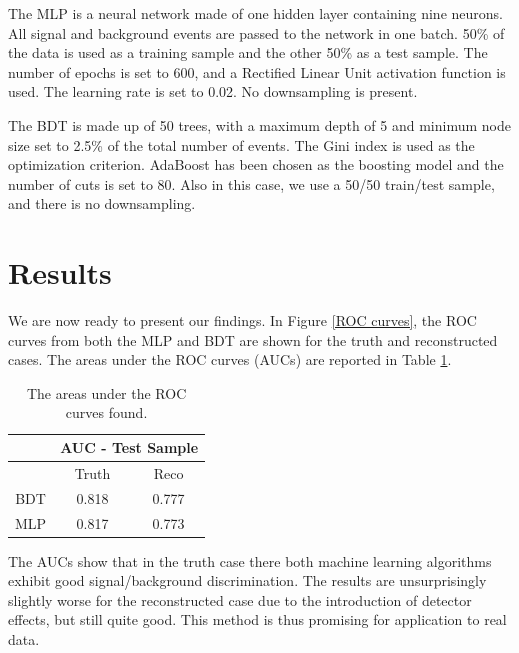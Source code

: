 \documentclass[10pt,a4paper]{book}
\begin{document}
The MLP is a neural network made of one hidden layer containing nine neurons. All signal and background events are passed to the network in one batch. 50\% of the data is used as a training sample and the other 50\% as a test sample. The number of epochs is set to 600, and a Rectified Linear Unit activation function is used. The learning rate is set to 0.02. No downsampling is present.

The BDT is made up of 50 trees, with a maximum depth of 5 and minimum node size set to 2.5\% of the total number of events. The Gini index is used as the optimization criterion. AdaBoost has been chosen as the boosting model and the number of cuts is set to 80. Also in this case, we use a 50/50 train/test sample, and there is no downsampling.


\section{Results}

We are now ready to present our findings. In Figure \ref{ROC curves}, the ROC curves from both the MLP and BDT are shown for the truth and reconstructed cases. The areas under the ROC curves (AUCs) are reported in Table \ref{AUC table}.

\begin{table}[h!]
\centering
\begin{tabular}{|c|c|c|}
\hline 
\* & \multicolumn{2}{c|}{AUC - Test Sample} \\ 
\hline 
\* & Truth & Reco \\ 
\hline 
BDT & 0.818 & 0.777 \\ 
\hline 
MLP & 0.817 & 0.773 \\  
\hline 
\end{tabular} 
\caption{The areas under the ROC curves found.}
\label{AUC table}
\end{table} 

The AUCs show that in the truth case there both machine learning algorithms exhibit good signal/background discrimination. The results are unsurprisingly slightly worse for the reconstructed case due to the introduction of detector effects, but still quite good. This method is thus promising for application to real data.
\end{document}
